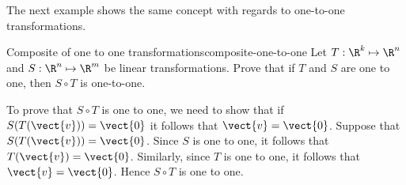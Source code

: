 The next example shows the same concept with regards to one-to-one transformations. 

\begin{example}{Composite of one to one transformations}{composite-one-to-one}
Let $T: \R^k \mapsto \R^n$ and $S: \R^n \mapsto \R^m$ be linear transformations. 
Prove that if $T$ and $S$ are one to one, then $S \circ T$ 
is one-to-one.
\end{example}

\begin{solution}
To prove that $S \circ T$ is one to one, we need to show that if $S(T (\vect{v})) = \vect{0}$ it follows that $\vect{v} = \vect{0}$. 
Suppose that  $S(T (\vect{v})) = \vect{0}$. Since $S$ is one to one, it follows that  $T (\vect{v}) = \vect{0}$. Similarly, since $T$ is one to one, it follows that $\vect{v} = \vect{0}$. Hence $S \circ T$ is one to one. 
\end{solution}
